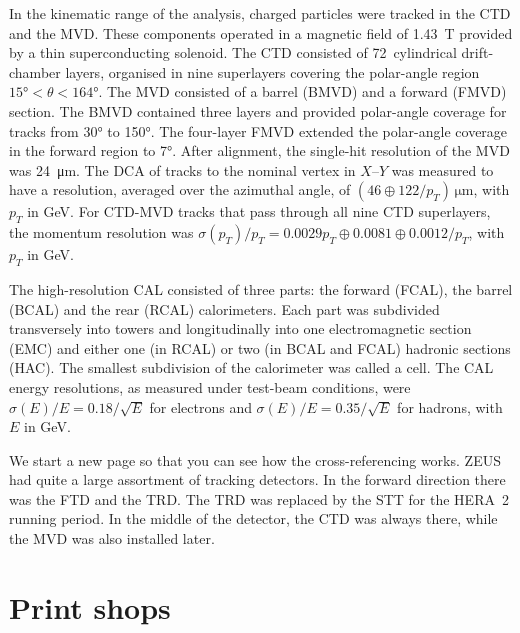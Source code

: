 In the kinematic range of the analysis, charged particles were tracked
in the \gls{CTD} and the
\gls{MVD}. These components operated in a magnetic
field of \SI{1.43}{\tesla} provided by a thin superconducting solenoid. The
\gls{CTD} consisted of 72~cylindrical drift-chamber layers, organised in nine
superlayers covering the polar-angle region
$\ang{15} < \theta < \ang{164}$.
%
The \gls{MVD} consisted of a barrel (BMVD) and a forward (FMVD)
section. The BMVD contained three layers and provided polar-angle
coverage for tracks from \ang{30} to \ang{150}. The four-layer FMVD
extended the polar-angle coverage in the forward region to
\ang{7}. After alignment, the single-hit resolution of the MVD was
\SI{24}{\micro\metre}. The \gls{DCA} of tracks to the nominal vertex in
$X$--$Y$ was measured to have a resolution, averaged over the
azimuthal angle, of $(46 \oplus 122 /
  p_{T})\,\si{\micro\metre}$, with $p_{T}$ in \si{\GeV}.  For \gls{CTD}-\gls{MVD} tracks
that pass through all nine \gls{CTD} superlayers, the momentum
resolution was $\sigma(p_{T})/p_{T} = 0.0029 p_{T} \oplus 0.0081
\oplus 0.0012/p_{T}$, with $p_{T}$ in \si{\GeV}.

The high-resolution \gls{CAL} consisted of three parts: the forward
(FCAL), the barrel (BCAL) and the rear (RCAL) calorimeters. Each part
was subdivided transversely into towers and longitudinally into one
electromagnetic section (EMC) and either one (in RCAL) or two (in BCAL
and FCAL) hadronic sections (HAC). The smallest subdivision of the
calorimeter was called a cell.  The \gls{CAL} energy resolutions, as
measured under test-beam conditions, were $\sigma(E)/E=0.18/\sqrt{E}$
for electrons and $\sigma(E)/E=0.35/\sqrt{E}$ for hadrons, with $E$ in
\si{\GeV}.  \clearpage

We start a new page so that you can see how the cross-referencing
works.  ZEUS had quite a large assortment of tracking detectors. In the
forward direction there was the \gls{FTD} and the \gls{TRD}. The
\gls{TRD} was replaced by the \gls{STT} for the HERA~2 running
period.  In the middle of the detector, the \gls{CTD} was always
there, while the \gls{MVD} was also installed later.


\chapter{Print shops}
\label{app:printer}

